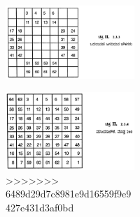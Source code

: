 \begin{figure}[H]
\begin{figure}[H]
\begin{figure}[h]
\begin{figure}[H]
\end{figure}
\begin{figure}[H]
\includegraphics[scale=.85]{src/figures/chap3/fig3.26.jpg}
\end{figure}
\begin{figure}[H]
\includegraphics[scale=.85]{src/figures/chap3/fig3.27.jpg}
>>>>>>> 6489d29d7c8981e9d16559f9e9427e431d3af0bd
\end{figure}

\newpage


\end{figure}
\end{figure}
\end{figure}
